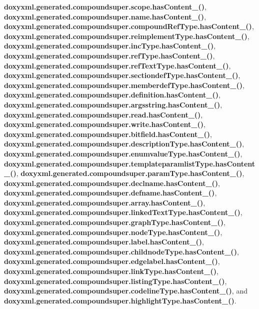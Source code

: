 {\bf doxyxml.\+generated.\+compoundsuper.\+scope.\+has\+Content\+\_\+()}, {\bf doxyxml.\+generated.\+compoundsuper.\+name.\+has\+Content\+\_\+()}, {\bf doxyxml.\+generated.\+compoundsuper.\+compound\+Ref\+Type.\+has\+Content\+\_\+()}, {\bf doxyxml.\+generated.\+compoundsuper.\+reimplement\+Type.\+has\+Content\+\_\+()}, {\bf doxyxml.\+generated.\+compoundsuper.\+inc\+Type.\+has\+Content\+\_\+()}, {\bf doxyxml.\+generated.\+compoundsuper.\+ref\+Type.\+has\+Content\+\_\+()}, {\bf doxyxml.\+generated.\+compoundsuper.\+ref\+Text\+Type.\+has\+Content\+\_\+()}, {\bf doxyxml.\+generated.\+compoundsuper.\+sectiondef\+Type.\+has\+Content\+\_\+()}, {\bf doxyxml.\+generated.\+compoundsuper.\+memberdef\+Type.\+has\+Content\+\_\+()}, {\bf doxyxml.\+generated.\+compoundsuper.\+definition.\+has\+Content\+\_\+()}, {\bf doxyxml.\+generated.\+compoundsuper.\+argsstring.\+has\+Content\+\_\+()}, {\bf doxyxml.\+generated.\+compoundsuper.\+read.\+has\+Content\+\_\+()}, {\bf doxyxml.\+generated.\+compoundsuper.\+write.\+has\+Content\+\_\+()}, {\bf doxyxml.\+generated.\+compoundsuper.\+bitfield.\+has\+Content\+\_\+()}, {\bf doxyxml.\+generated.\+compoundsuper.\+description\+Type.\+has\+Content\+\_\+()}, {\bf doxyxml.\+generated.\+compoundsuper.\+enumvalue\+Type.\+has\+Content\+\_\+()}, {\bf doxyxml.\+generated.\+compoundsuper.\+templateparamlist\+Type.\+has\+Content\+\_\+()}, {\bf doxyxml.\+generated.\+compoundsuper.\+param\+Type.\+has\+Content\+\_\+()}, {\bf doxyxml.\+generated.\+compoundsuper.\+declname.\+has\+Content\+\_\+()}, {\bf doxyxml.\+generated.\+compoundsuper.\+defname.\+has\+Content\+\_\+()}, {\bf doxyxml.\+generated.\+compoundsuper.\+array.\+has\+Content\+\_\+()}, {\bf doxyxml.\+generated.\+compoundsuper.\+linked\+Text\+Type.\+has\+Content\+\_\+()}, {\bf doxyxml.\+generated.\+compoundsuper.\+graph\+Type.\+has\+Content\+\_\+()}, {\bf doxyxml.\+generated.\+compoundsuper.\+node\+Type.\+has\+Content\+\_\+()}, {\bf doxyxml.\+generated.\+compoundsuper.\+label.\+has\+Content\+\_\+()}, {\bf doxyxml.\+generated.\+compoundsuper.\+childnode\+Type.\+has\+Content\+\_\+()}, {\bf doxyxml.\+generated.\+compoundsuper.\+edgelabel.\+has\+Content\+\_\+()}, {\bf doxyxml.\+generated.\+compoundsuper.\+link\+Type.\+has\+Content\+\_\+()}, {\bf doxyxml.\+generated.\+compoundsuper.\+listing\+Type.\+has\+Content\+\_\+()}, {\bf doxyxml.\+generated.\+compoundsuper.\+codeline\+Type.\+has\+Content\+\_\+()}, and {\bf doxyxml.\+generated.\+compoundsuper.\+highlight\+Type.\+has\+Content\+\_\+()}.

